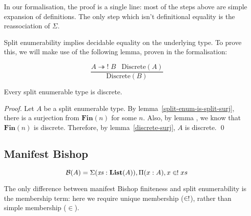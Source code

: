 In our formalisation, the proof is a single line: most of the steps above are
simple expansion of definitions.
The only step which isn't definitional equality is the reassociation of
\(\Sigma\).

Split enumerability implies decidable equality on the underlying type.
To prove this, we will make use of the following lemma, proven in the
formalisation:
\begin{romlemma} \label{discrete-surj}
  \begin{equation}
    \frac{
        A \twoheadrightarrow! \; B \; \; \; \text{Discrete}(A)
      }{
       \text{Discrete}(B) 
      }
  \end{equation}
\end{romlemma}
\begin{romlemma}
  Every split enumerable type is discrete.
\end{romlemma}
\begin{proof}
  Let \(A\) be a split enumerable type.
  By lemma~\ref{split-enum-is-split-surj}, there is a surjection from
  \(\mathbf{Fin}(n)\) for some \(n\).
  Also, by lemma , we know that
  \(\mathbf{Fin}(n)\) is discrete.
  Therefore, by lemma~\ref{discrete-surj}, \(A\) is discrete.
  \qed
\end{proof}
\subsection{Manifest Bishop}
\begin{romdefinition}
  \begin{equation}
    \mathcal{B}(A) = \Sigma {(\mathit{xs} : \textbf{List}(A))} , \Pi {(x : A)} , x \inunique xs
  \end{equation}
\end{romdefinition}
The only difference between manifest Bishop finiteness and split enumerability
is the membership term: here we require unique membership (\(\inunique\)),
rather than simple membership (\(\in\)).

